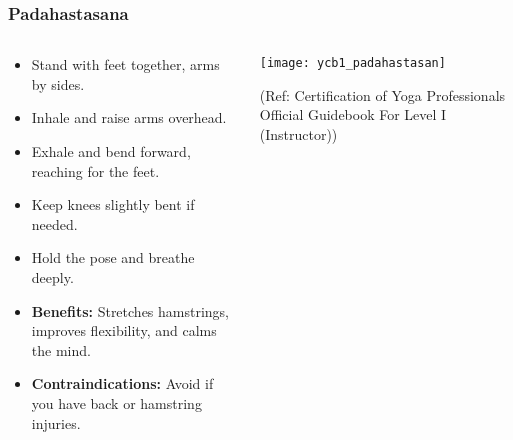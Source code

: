 \begin{frame}[fragile]\frametitle{Padahastasana}
\begin{columns}
    \begin{column}[T]{0.5\linewidth}
      \begin{itemize}
        \item Stand with feet together, arms by sides.
        \item Inhale and raise arms overhead.
        \item Exhale and bend forward, reaching for the feet.
        \item Keep knees slightly bent if needed.
        \item Hold the pose and breathe deeply.
        \item \textbf{Benefits:} Stretches hamstrings, improves flexibility, and calms the mind.
        \item \textbf{Contraindications:} Avoid if you have back or hamstring injuries.
      \end{itemize}
    \end{column}
    \begin{column}[T]{0.5\linewidth}
        \begin{center}
        \begin{center}
		        \texttt{[image: ycb1\_padahastasan]}
				
				{\tiny (Ref: Certification  of Yoga Professionals Official Guidebook For Level I (Instructor))}	        
		\end{center}   
        \end{center}    
    \end{column}
  \end{columns}
\end{frame}

